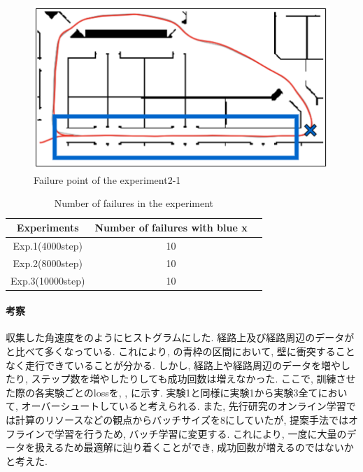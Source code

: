 \begin{figure}[h]
  \centering
  \includegraphics[keepaspectratio, scale=0.5]{images/result2.png}
  \caption{Failure point of the experiment2-1}
  \label{Fig:result2}
  \end{figure}

\begin{table}[h]
  \centering
  \begin{tabular}{|c|c|c|} \hline
    Experiments & Number of failures with blue x \\ \hline
    Exp.1(4000step) & 10 \\ \hline
    Exp.2(8000step) & 10 \\ \hline
    Exp.3(10000step) & 10 \\ \hline
  \end{tabular}
  \caption{Number of failures in the experiment}
  \label{tb:fail2}
\end{table}

\newpage
\paragraph{考察}
収集した角速度をのようにヒストグラムにした. 経路上及び経路周辺のデータがと比べて多くなっている. これにより, の青枠の区間において, 壁に衝突することなく走行できていることが分かる. しかし, 経路上や経路周辺のデータを増やしたり, ステップ数を増やしたりしても成功回数は増えなかった. ここで, 訓練させた際の各実験ごとのlossを, , に示す. 実験1と同様に実験1から実験3全てにおいて, オーバーシュートしていると考えられる. また, 先行研究のオンライン学習では計算のリソースなどの観点からバッチサイズを8にしていたが, 提案手法ではオフラインで学習を行うため, バッチ学習に変更する. これにより, 一度に大量のデータを扱えるため最適解に辿り着くことができ, 成功回数が増えるのではないかと考えた. 

